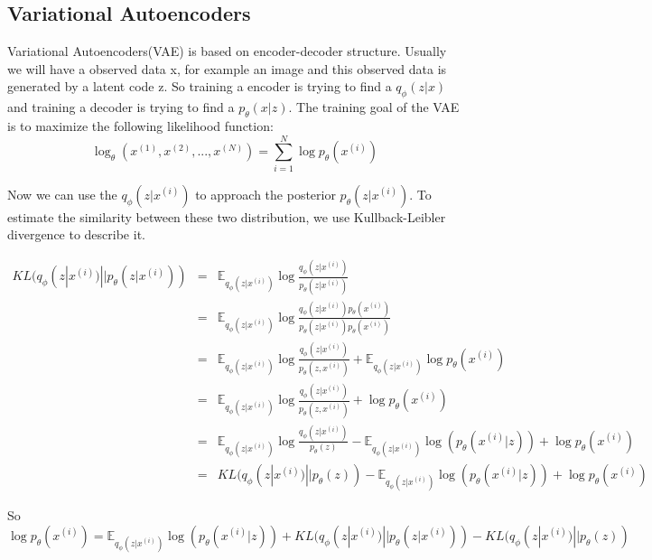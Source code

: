 \documentclass{kththesis}
\begin{document}
\subsection{Variational Autoencoders}
Variational Autoencoders\cite{kingma2013auto,doersch2016tutorial}(VAE) is based on encoder-decoder structure. Usually we will have a observed data x, for example an image and this observed data is generated by a latent code z. So training a encoder is trying to find a $q_{\phi}(z|x)$ and training a decoder is trying to find a $p_{\theta}(x|z)$. The training goal of the VAE is to maximize the following likelihood function:
\begin{equation}
    \log_{\theta}(x^{(1)},x^{(2)},...,x^{(N)}) = \sum_{i=1}^{N}\log p_\theta(x^{(i)})
\end{equation}

Now we can use the $q_{\phi}(z|x^{(i)})$ to approach the posterior  $p_{\theta}(z|x^{(i)})$. To estimate the similarity between these two distribution, we use Kullback-Leibler divergence to describe it.

\begin{eqnarray}
KL(q_{\phi}(z|x^{(i)})||p_{\theta}(z|x^{(i)})) &=& \mathbb{E}_{q_{\phi}(z|x^{(i)})} \log \frac{q_{\phi}(z|x^{(i)})}{p_{\theta}(z|x^{(i)})} \nonumber \\
&=& \mathbb{E}_{q_{\phi}(z|x^{(i)})} \log \frac{q_{\phi}(z|x^{(i)})p_{\theta}(x^{(i)})}{p_{\theta}(z|x^{(i)})p_{\theta}(x^{(i)})} \nonumber \\
&=& \mathbb{E}_{q_{\phi}(z|x^{(i)})} \log \frac{q_{\phi}(z|x^{(i)})}{p_{\theta}(z,x^{(i)})}+\mathbb{E}_{q_{\phi}(z|x^{(i)})} \log p_{\theta}(x^{(i)}) \nonumber \\
&=& \mathbb{E}_{q_{\phi}(z|x^{(i)})} \log \frac{q_{\phi}(z|x^{(i)})}{p_{\theta}(z,x^{(i)})}+ \log p_{\theta}(x^{(i)}) \nonumber \\
&=& \mathbb{E}_{q_{\phi}(z|x^{(i)})} \log \frac{q_{\phi}(z|x^{(i)})}{p_{\theta}(z)} -\mathbb{E}_{q_{\phi}(z|x^{(i)})} \log(p_{\theta}(x^{(i)}|z)) + \log p_{\theta}(x^{(i)}) \nonumber \\
&=& KL(q_{\phi}(z|x^{(i)})||p_{\theta}(z)) -\mathbb{E}_{q_{\phi}(z|x^{(i)})} \log(p_{\theta}(x^{(i)}|z)) + \log p_{\theta}(x^{(i)}) \nonumber
\end{eqnarray}

So 
\begin{equation}
    \log p_{\theta}(x^{(i)}) = \mathbb{E}_{q_{\phi}(z|x^{(i)})} \log(p_{\theta}(x^{(i)}|z))+ KL(q_{\phi}(z|x^{(i)})||p_{\theta}(z|x^{(i)})) - KL(q_{\phi}(z|x^{(i)})||p_{\theta}(z))
\end{equation}
\end{document}
